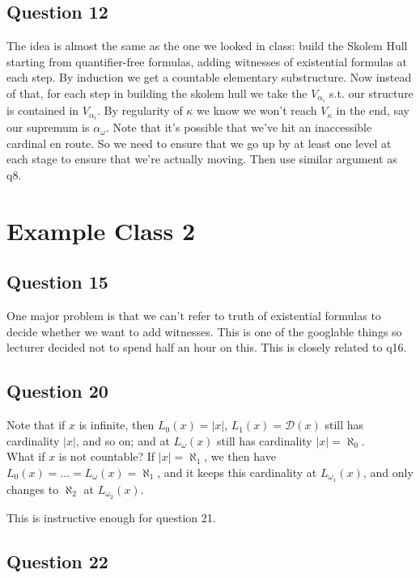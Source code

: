 \documentclass[a4paper]{article}
\begin{document}
\subsection{Question 12}
The idea is almost the same as the one we looked in class: build the Skolem Hull starting from quantifier-free formulas, adding witnesses of existential formulas at each step. By induction we get a countable elementary substructure. Now instead of that, for each step in building the skolem hull we take the $V_{\alpha_i}$ s.t. our structure is contained in $V_{\alpha_i}$. By regularity of $\kappa$ we know we won't reach $V_\kappa$ in the end, say our supremum is $\alpha_\omega$. Note that it's possible that we've hit an inaccessible cardinal en route. So we need to ensure that we go up by at least one level at each stage to ensure that we're actually moving. Then use similar argument as q8.

\newpage

\section{Example Class 2}

\subsection{Question 15}

One major problem is that we can't refer to truth of existential formulas to decide whether we want to add witnesses. This is one of the googlable things so lecturer decided not to spend half an hour on this. This is closely related to q16.

\subsection{Question 20}
Note that if $x$ is infinite, then $L_0(x) = |x|$, $L_1(x) = \mathcal{D}(x)$ still has cardinality $|x|$, and so on; and at $L_\omega(x)$ still has cardinality $|x| = \aleph_0$.\\
What if $x$ is not countable? If $|x| = \aleph_1$, we then have $L_0(x) = ... = L_\omega(x)=\aleph_1$, and it keeps this cardinality at $L_{\omega_1}(x)$, and only changes to $\aleph_2$ at $L_{\omega_2}(x)$.

This is instructive enough for question 21.

\subsection{Question 22}
\end{document}
